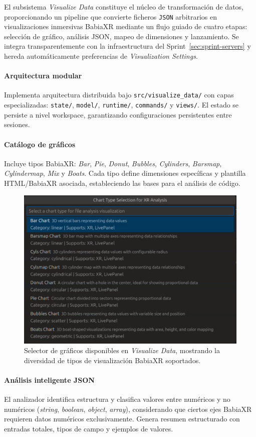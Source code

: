 \documentclass[a4paper, 12pt]{book}
\begin{document}
El subsistema \emph{Visualize Data} constituye el núcleo de transformación de datos, proporcionando un pipeline que convierte ficheros \texttt{JSON} arbitrarios en visualizaciones inmersivas BabiaXR mediante un flujo guiado de cuatro etapas: selección de gráfico, análisis JSON, mapeo de dimensiones y lanzamiento. Se integra transparentemente con la infraestructura del Sprint~\ref{sec:sprint-servers} y hereda automáticamente preferencias de \emph{Visualization Settings}.

\paragraph{Arquitectura modular}
Implementa arquitectura distribuida bajo \texttt{src/visualize\_data/} con capas especializadas: \texttt{state/}, \texttt{model/}, \texttt{runtime/}, \texttt{commands/} y \texttt{views/}. El estado se persiste a nivel workspace, garantizando configuraciones persistentes entre sesiones.

\paragraph{Catálogo de gráficos}
Incluye tipos BabiaXR: \emph{Bar}, \emph{Pie}, \emph{Donut}, \emph{Bubbles}, \emph{Cylinders}, \emph{Barsmap}, \emph{Cylindermap}, \emph{Mix} y \emph{Boats}. Cada tipo define dimensiones específicas y plantilla HTML/BabiaXR asociada, estableciendo las bases para el análisis de código.

\begin{figure}[H]
\centering
\includegraphics[width=0.58\linewidth]{img/graficos_babiaxr.png}
\caption{Selector de gráficos disponibles en \emph{Visualize Data}, mostrando la diversidad de tipos de visualización BabiaXR soportados.}
\label{fig:visualize-chart-selector}
\end{figure}

\paragraph{Análisis inteligente JSON}
El analizador identifica estructura y clasifica valores entre numéricos y no numéricos (\emph{string}, \emph{boolean}, \emph{object}, \emph{array}), considerando que ciertos ejes BabiaXR requieren datos numéricos exclusivamente. Genera resumen estructurado con entradas totales, tipos de campo y ejemplos de valores.
\end{document}
